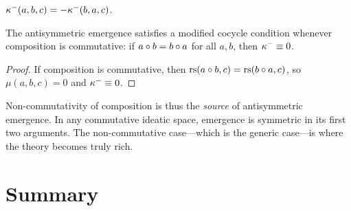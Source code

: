 \begin{proposition}
$\kappa^-(a,b,c) = -\kappa^-(b,a,c)$.
\end{proposition}

\begin{theorem}
The antisymmetric emergence satisfies a modified cocycle condition
whenever composition is commutative: if $a \circ b = b \circ a$
for all $a, b$, then $\kappa^- \equiv 0$.
\end{theorem}
\begin{proof}
If composition is commutative, then $\mathrm{rs}(a \circ b, c) = \mathrm{rs}(b \circ
a, c)$, so $\mu(a,b,c) = 0$ and $\kappa^- \equiv 0$.
\end{proof}

\begin{remark}
Non-commutativity of composition is thus the \emph{source} of antisymmetric
emergence. In any commutative ideatic space, emergence is symmetric in its
first two arguments. The non-commutative case---which is the generic
case---is where the theory becomes truly rich.
\end{remark}

\section{Summary}

